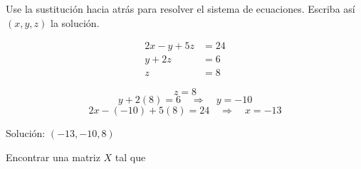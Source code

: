 \documentclass[answers]{exam}
\begin{document}
\begin{questions}
    \begin{solution}
        \end{solution}
                

    \question Use la sustitución hacia atrás para resolver el sistema de ecuaciones. Escriba así \((x,y,z)\) la solución.

    \[
    \begin{aligned}
    2x - y + 5z &= 24 \\
    y + 2z &= 6 \\
    z &= 8
    \end{aligned}
    \]

    \begin{solution}
        \[
        z = 8
        \]
        \[
        y + 2(8) = 6 \quad \Rightarrow \quad y = -10
        \]
        \[
        2x - (-10) + 5(8) = 24 \quad \Rightarrow \quad x = -13
        \]
        
        Solución: \((-13, -10, 8)\)
        \end{solution}
        

    \question Encontrar una matriz \(X\) tal que 


\end{questions}
\end{document}
